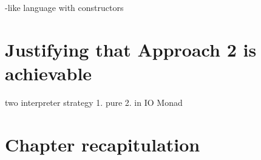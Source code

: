 \documentclass[thesis-solanki.tex]{subfiles}
\begin{document}
\begin{code-list}[H]
\begin{singlespace}

  \inputminted[linenos, firstline=7, lastline=16]{haskell}{haskell-proto4-platen-winkel.hs}
\end{singlespace}
\caption{-like language with  constructors}
\label{tab:prologresultdatatype}
\end{code-list}

\section{Justifying that Approach 2 is achievable}
two interpreter strategy
1. pure
2. in IO Monad


\section{Chapter recapitulation}

\ifMain\ifDraft
\begin{scope}
  \nolinenumbers
  \enotesize
  \par
  \begin{singlespace}
  \setlength{\parskip}{12pt plus 2pt minus 1pt}
  \theendnotes
  \par
  \end{singlespace}
\end{scope}
\fi\fi
\end{document}
